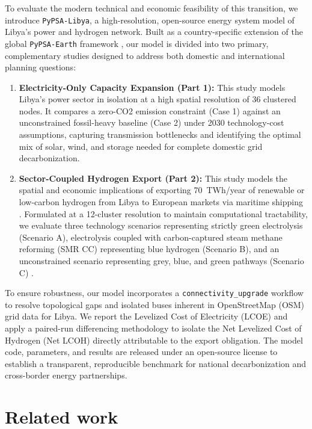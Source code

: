 \documentclass[preprint,12pt]{elsarticle}
\begin{document}
To evaluate the modern technical and economic feasibility of this transition, we introduce \texttt{PyPSA-Libya}, a high-resolution, open-source energy system model of Libya's power and hydrogen network. Built as a country-specific extension of the global \texttt{PyPSA-Earth} framework \cite{abdelkhalek2025pypsa}, our model is divided into two primary, complementary studies designed to address both domestic and international planning questions:
\begin{enumerate}
    \item \textbf{Electricity-Only Capacity Expansion (Part 1):} This study models Libya's power sector in isolation at a high spatial resolution of 36 clustered nodes. It compares a zero-CO2 emission constraint (Case 1) against an unconstrained fossil-heavy baseline (Case 2) under 2030 technology-cost assumptions, capturing transmission bottlenecks and identifying the optimal mix of solar, wind, and storage needed for complete domestic grid decarbonization.
    \item \textbf{Sector-Coupled Hydrogen Export (Part 2):} This study models the spatial and economic implications of exporting 70~TWh/year of renewable or low-carbon hydrogen from Libya to European markets via maritime shipping \cite{abdelkhalek2025pypsa}. Formulated at a 12-cluster resolution to maintain computational tractability, we evaluate three technology scenarios representing strictly green electrolysis (Scenario A), electrolysis coupled with carbon-captured steam methane reforming (SMR CC) representing blue hydrogen (Scenario B), and an unconstrained scenario representing grey, blue, and green pathways (Scenario C) .
\end{enumerate}

To ensure robustness, our model incorporates a \texttt{connectivity\_upgrade} workflow to resolve topological gaps and isolated buses inherent in OpenStreetMap (OSM) grid data for Libya. We report the Levelized Cost of Electricity (LCOE) and apply a paired-run differencing methodology to isolate the Net Levelized Cost of Hydrogen (Net LCOH) directly attributable to the export obligation. The model code, parameters, and results are released under an open-source license to establish a transparent, reproducible benchmark for national decarbonization and cross-border energy partnerships.


\section{Related work}
\label{sec:related_work}
\end{document}

